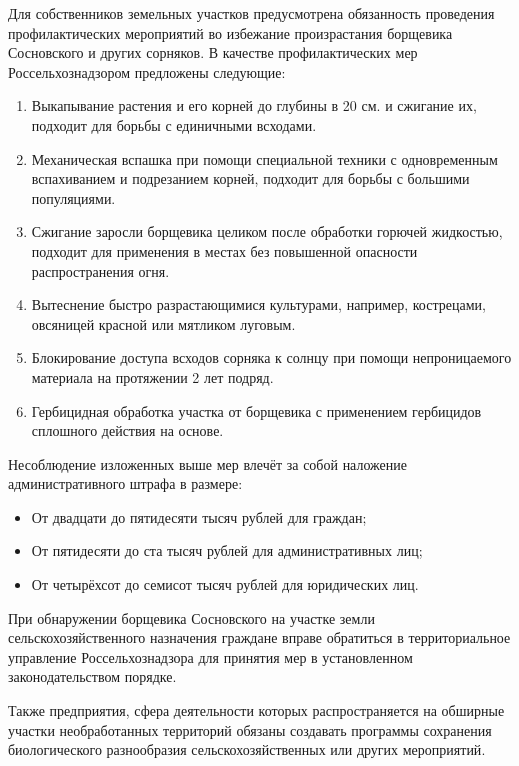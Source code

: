 \tab
Для собственников земельных участков предусмотрена обязанность проведения профилактических мероприятий во избежание произрастания борщевика Сосновского и других сорняков\cite{rural-measures}.
В качестве профилактических мер Россельхознадзором\cite{countryside-measures} предложены следующие:
\begin{enumerate}
	\item Выкапывание растения и его корней до глубины в 20 см. и сжигание их, подходит для борьбы с единичными всходами.
	\item Механическая вспашка при помощи специальной техники с одновременным вспахиванием и подрезанием корней, подходит для борьбы с большими популяциями.
	\item Сжигание заросли борщевика целиком после обработки горючей жидкостью, подходит для применения в местах без повышенной опасности распространения огня.
	\item Вытеснение быстро разрастающимися культурами, например, кострецами, овсяницей красной или мятликом луговым.
	\item Блокирование доступа всходов сорняка к солнцу при помощи непроницаемого материала на протяжении 2 лет подряд.
	\item Гербицидная обработка участка от борщевика с применением гербицидов сплошного действия на основе.
\end{enumerate}

\tab
Несоблюдение изложенных выше мер влечёт за собой наложение административного штрафа\cite{rural-fine} в размере:
\begin{itemize}
	\item От двадцати до пятидесяти тысяч рублей для граждан;
	\item От пятидесяти до ста тысяч рублей для административных лиц;
	\item От четырёхсот до семисот тысяч рублей для юридических лиц.
\end{itemize}

\tab
При обнаружении борщевика Сосновского на участке земли сельскохозяйственного назначения\cite{rural-law} граждане вправе обратиться в территориальное управление Россельхознадзора для принятия мер в установленном законодательством порядке.

\tab
Также предприятия, сфера деятельности которых распространяется на обширные участки необработанных территорий обязаны создавать программы сохранения биологического разнообразия сельскохозяйственных или других мероприятий\cite{nature-law}.

